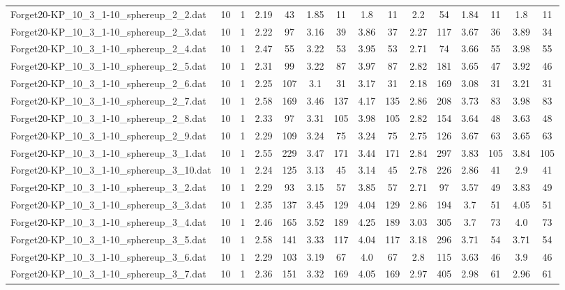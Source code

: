 \begin{table}[!ht]
{\begin{tabular}{lcccccccccccccc}
Forget20-KP\_10\_3\_1-10\_sphereup\_2\_2.dat & 10 & 1 & 2.19 & 43 & 1.85 & 11 & 1.8 & 11 & 2.2 & 54 & 1.84 & 11 & 1.8 & 11 \\
Forget20-KP\_10\_3\_1-10\_sphereup\_2\_3.dat & 10 & 1 & 2.22 & 97 & 3.16 & 39 & 3.86 & 37 & 2.27 & 117 & 3.67 & 36 & 3.89 & 34 \\
Forget20-KP\_10\_3\_1-10\_sphereup\_2\_4.dat & 10 & 1 & 2.47 & 55 & 3.22 & 53 & 3.95 & 53 & 2.71 & 74 & 3.66 & 55 & 3.98 & 55 \\
Forget20-KP\_10\_3\_1-10\_sphereup\_2\_5.dat & 10 & 1 & 2.31 & 99 & 3.22 & 87 & 3.97 & 87 & 2.82 & 181 & 3.65 & 47 & 3.92 & 46 \\
Forget20-KP\_10\_3\_1-10\_sphereup\_2\_6.dat & 10 & 1 & 2.25 & 107 & 3.1 & 31 & 3.17 & 31 & 2.18 & 169 & 3.08 & 31 & 3.21 & 31 \\
Forget20-KP\_10\_3\_1-10\_sphereup\_2\_7.dat & 10 & 1 & 2.58 & 169 & 3.46 & 137 & 4.17 & 135 & 2.86 & 208 & 3.73 & 83 & 3.98 & 83 \\
Forget20-KP\_10\_3\_1-10\_sphereup\_2\_8.dat & 10 & 1 & 2.33 & 97 & 3.31 & 105 & 3.98 & 105 & 2.82 & 154 & 3.64 & 48 & 3.63 & 48 \\
Forget20-KP\_10\_3\_1-10\_sphereup\_2\_9.dat & 10 & 1 & 2.29 & 109 & 3.24 & 75 & 3.24 & 75 & 2.75 & 126 & 3.67 & 63 & 3.65 & 63 \\
Forget20-KP\_10\_3\_1-10\_sphereup\_3\_1.dat & 10 & 1 & 2.55 & 229 & 3.47 & 171 & 3.44 & 171 & 2.84 & 297 & 3.83 & 105 & 3.84 & 105 \\
Forget20-KP\_10\_3\_1-10\_sphereup\_3\_10.dat & 10 & 1 & 2.24 & 125 & 3.13 & 45 & 3.14 & 45 & 2.78 & 226 & 2.86 & 41 & 2.9 & 41 \\
Forget20-KP\_10\_3\_1-10\_sphereup\_3\_2.dat & 10 & 1 & 2.29 & 93 & 3.15 & 57 & 3.85 & 57 & 2.71 & 97 & 3.57 & 49 & 3.83 & 49 \\
Forget20-KP\_10\_3\_1-10\_sphereup\_3\_3.dat & 10 & 1 & 2.35 & 137 & 3.45 & 129 & 4.04 & 129 & 2.86 & 194 & 3.7 & 51 & 4.05 & 51 \\
Forget20-KP\_10\_3\_1-10\_sphereup\_3\_4.dat & 10 & 1 & 2.46 & 165 & 3.52 & 189 & 4.25 & 189 & 3.03 & 305 & 3.7 & 73 & 4.0 & 73 \\
Forget20-KP\_10\_3\_1-10\_sphereup\_3\_5.dat & 10 & 1 & 2.58 & 141 & 3.33 & 117 & 4.04 & 117 & 3.18 & 296 & 3.71 & 54 & 3.71 & 54 \\
Forget20-KP\_10\_3\_1-10\_sphereup\_3\_6.dat & 10 & 1 & 2.29 & 103 & 3.19 & 67 & 4.0 & 67 & 2.8 & 115 & 3.63 & 46 & 3.9 & 46 \\
Forget20-KP\_10\_3\_1-10\_sphereup\_3\_7.dat & 10 & 1 & 2.36 & 151 & 3.32 & 169 & 4.05 & 169 & 2.97 & 405 & 2.98 & 61 & 2.96 & 61 \\

\end{tabular}}
\end{table}
